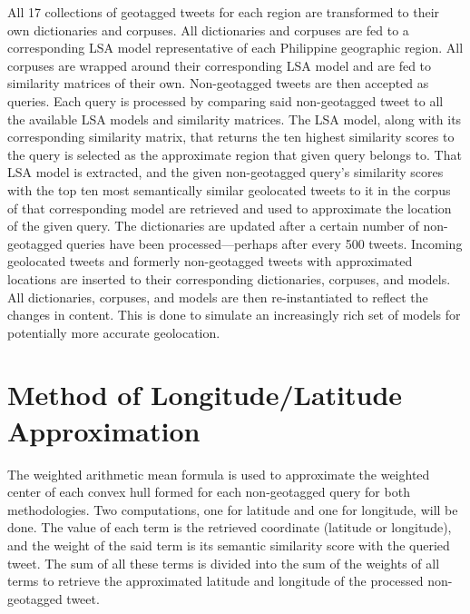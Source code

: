 All 17 collections of geotagged tweets for each region are transformed to their own dictionaries and corpuses. All dictionaries and corpuses are fed to a corresponding LSA model representative of each Philippine geographic region. All corpuses are wrapped around their corresponding LSA model and are fed to similarity matrices of their own. Non-geotagged tweets are then accepted as queries. Each query is processed by comparing said non-geotagged tweet to all the available LSA models and similarity matrices. The LSA model, along with its corresponding similarity matrix, that returns the ten highest similarity scores to the query is selected as the approximate region that given query belongs to. That LSA model is extracted, and the given non-geotagged query’s similarity scores with the top ten most semantically similar geolocated tweets to it in the corpus of that corresponding model are retrieved and used to approximate the location of the given query. The dictionaries are updated after a certain number of non-geotagged queries have been processed—perhaps after every 500 tweets. Incoming geolocated tweets and formerly non-geotagged tweets with approximated locations are inserted to their corresponding dictionaries, corpuses, and models. All dictionaries, corpuses, and models are then re-instantiated to reflect the changes in content. This is done to simulate an increasingly rich set of models for potentially more accurate geolocation.

\section{Method of Longitude/Latitude Approximation}

The weighted arithmetic mean formula is used to approximate the weighted center of each convex hull formed for each non-geotagged query for both methodologies. Two computations, one for latitude and one for longitude, will be done. The value of each term is the retrieved coordinate (latitude or longitude), and the weight of the said term is its semantic similarity score with the queried tweet. The sum of all these terms is  divided into the sum of the weights of all terms to retrieve the approximated latitude and longitude of the processed non-geotagged tweet.

